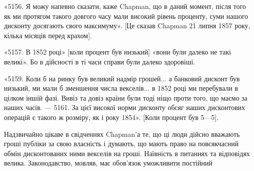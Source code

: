 «5156. Я можу напевно сказати, каже Chapman, що в даний момент, після
того як ми протягом такого довгого часу мали високий рівень проценту, суми
нашого дисконту досягають свого максимуму». [Це сказав Chapman 21 липня
1857 року, кілька місяців перед крахом].

«5157. В 1852 році» [коли процент був низький] «вони були далеко не
такі великі». Бо в дійсності в ті часи справи були далеко здоровіші.

«5159. Коли б на ринку був великий надмір грошей... а банковий дисконт
був низький, ми мали б зменшення числа векселів... в 1852 році ми
перебували в цілком іншій фазі. Вивіз та довіз країни були тоді ніщо проти
того, що маємо за наших часів. — 5161. За цієї високої норми дисконту обсяг
наших дисконтових операцій є такого ж розміру, як і року 1854». [Коли процент
був 5—5].

Надзвичайно цікаве в свідченнях Chapman’а те, що ці люди дійсно вважають
гроші публіки за свою власність і думають, що мають право на повсякчасний
обмін дисконтованих ними векселів на гроші. Наївність в питаннях
та відповідях велика. Законодавство, мовляв, має обов’язок уможливити постійний
\parbreak{}  %
